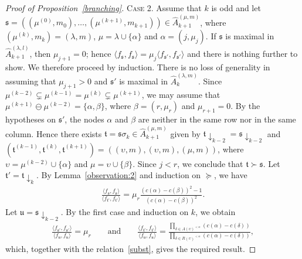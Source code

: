 \documentclass[11pt,a4paper,reqno,svgnames]{amsart}
\theoremstyle{plain}
\theoremstyle{definition}
\numberwithin{equation}{section}
\begin{document}
\begin{proof}[Proof of Proposition~\ref{branching}]
{\textsc{Case 2.}} Assume that $k$ is odd and let $\mathfrak{s}=((\mu^{(0)},m_0),\ldots,(\mu^{(k+1)},m_{k+1}))\in\hat{A}_{k+1}^{(\mu,m)}$, where $(\mu^{(k)},m_k)=(\lambda,m)$,  $\mu=\lambda\cup\lbrace \alpha\rbrace$ and  $\alpha=(j,\mu_j)$. If $\mathfrak{s}$ is maximal in $\hat{A}_{k+1}^{(\lambda,l)}$, then $\mu_{j+1}=0$; hence  $\langle f_\mathfrak{s},f_\mathfrak{s}\rangle =\mu_j\langle f_\mathfrak{s'},f_\mathfrak{s'}\rangle$ and there is nothing further to show. We therefore proceed by induction. There is no loss of generality in assuming that $\mu_{j+1}>0$ and $\mathfrak{s'}$ is maximal in $\hat{A}_k^{(\lambda,m)}$. Since $\mu^{(k-2)}\subsetneq \mu^{(k-1)}=\mu^{(k)}\subsetneq \mu^{(k+1)}$, we may assume that $\mu^{(k+1)}\ominus \mu^{(k-2)}=\lbrace\alpha,\beta\rbrace$, where $\beta=(r,\mu_r)$ and $\mu_{r+1}=0$. By the hypotheses on $\mathfrak{s'}$, the nodes $\alpha$ and $\beta$ are neither in the same row nor in the same column. Hence there exists $\mathfrak{t}=\mathfrak{s}\sigma_k\in\hat{A}_{k+1}^{(\mu,m)}$ given by $\mathfrak{t}\downarrow_{k-2}=\mathfrak{s}\downarrow_{k-2}$ and $(\mathfrak{t}^{(k-1)},\mathfrak{t}^{(k)},\mathfrak{t}^{(k+1)})=((\upsilon,m),(\upsilon,m),(\mu,m))$, where $\upsilon=\mu^{(k-2)}\cup\lbrace \alpha \rbrace $ and $\mu=\upsilon\cup\lbrace\beta\rbrace$. Since $j<r$, we conclude that $\mathfrak{t}\succ\mathfrak{s}$. Let $\mathfrak{t}'=\mathfrak{t}\downarrow_{k}$.  By Lemma~\ref{observation:2} and induction on $\succcurlyeq$, we have 
\begin{align}\label{subst}
\frac{\langle f_\mathfrak{s},f_\mathfrak{s}\rangle}{\langle f_\mathfrak{t'},f_\mathfrak{t'}\rangle}= {\mu_r}\frac{(c(\alpha)-c(\beta))^2-1}{(c(\alpha)-c(\beta))^2}.
\end{align}
Let $\mathfrak{u}=\mathfrak{s}\downarrow_{k-2}$. By the first case and induction on $k$, we obtain
\begin{align*}
\frac{\langle f_\mathfrak{s'},f_\mathfrak{s'}\rangle}{\langle f_\mathfrak{u},f_\mathfrak{u}\rangle}=\mu_r\qquad\text{and}\qquad \frac{\langle f_\mathfrak{t'},f_\mathfrak{t'}\rangle}{\langle f_\mathfrak{u},f_\mathfrak{u}\rangle}=\frac{\prod_{\delta\in A(\upsilon)^{<\alpha}}(c(\alpha)-c(\delta))}{\prod_{\delta\in R(\upsilon)^{<\alpha}}(c(\alpha)-c(\delta))},
\end{align*}
which, together with the relation~\eqref{subst}, gives the required result.


\end{proof}
\end{document}
